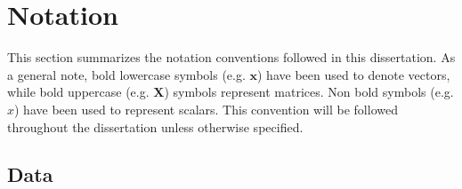 \chapter*{Notation} \label{ch:notation}
This section summarizes the notation conventions followed in this dissertation. As a general note, bold lowercase symbols (e.g. $\mathbf{x}$) have been used to denote vectors, while bold uppercase (e.g. $\mathbf{X}$) symbols represent matrices. Non bold symbols (e.g. $x$) have been used to represent scalars. This convention will be followed throughout the dissertation unless otherwise specified.

\section*{Data }

